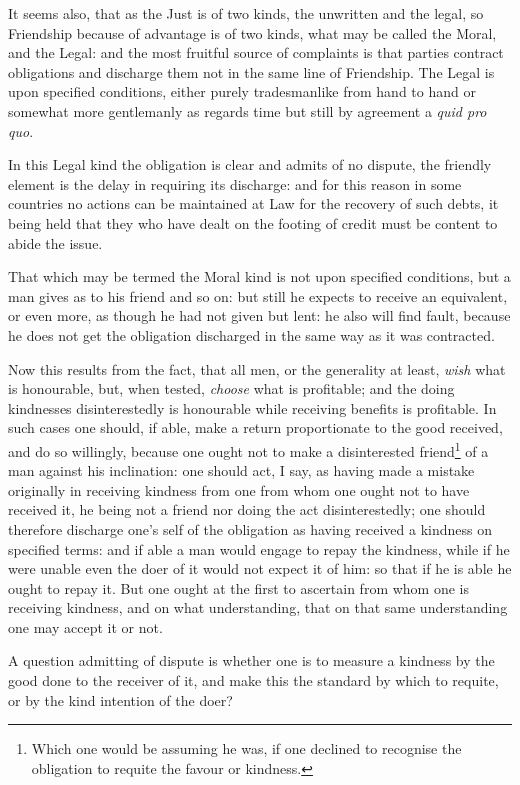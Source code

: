 It seems also, that as the Just is of two kinds, the unwritten and the legal,
so Friendship because of advantage is of two kinds, what may be called the
Moral, and the Legal: and the most fruitful source of complaints is that
parties contract obligations and discharge them not in the same line of
Friendship. The Legal is upon specified conditions, either purely tradesmanlike
from hand to hand or somewhat more gentlemanly as regards time but still by
agreement a \emph{quid pro quo}.

In this Legal kind the obligation is clear and admits of no dispute, the
friendly element is the delay in requiring its discharge: and for this reason
in some countries no actions can be maintained at Law for the recovery of such
debts, it being held that they who have dealt on the footing of credit must be
content to abide the issue.

That which may be termed the Moral kind is not upon specified conditions, but a
man gives as to his friend and so on: but still he expects to receive an
equivalent, or even more, as though he had not given but lent: he also will
find fault, because he does not get the obligation discharged in the same way
as it was contracted.

Now this results from the fact, that all men, or the generality at least,
\emph{wish} what is honourable, but, when tested, \emph{choose} what is
profitable; and the doing kindnesses disinterestedly is honourable while
receiving benefits is profitable. In such cases one should, if able, make a
return proportionate to the good received, and do so willingly, because one
ought not to make a disinterested friend\footnote{Which one would be assuming he was, if one declined to recognise the obligation
to requite the favour or kindness.}
of a man against his inclination: one should act, I say, as having made a
mistake originally in receiving kindness from one from whom one ought not to
have received it, he being not a friend nor doing the act disinterestedly; one
should therefore discharge one’s self of the obligation as having
received a kindness on specified terms: and if able a man would engage to repay
the kindness, while if he were unable even the doer of it would not expect it
of him: so that if he is able he ought to repay it. But one ought at the first
to ascertain from whom one is receiving kindness, and on what understanding,
that on that same understanding one may accept it or not.

A question admitting of dispute is whether one is to measure a kindness by the
good done to the receiver of it, and make this the standard by which to
requite, or by the kind intention of the doer?

